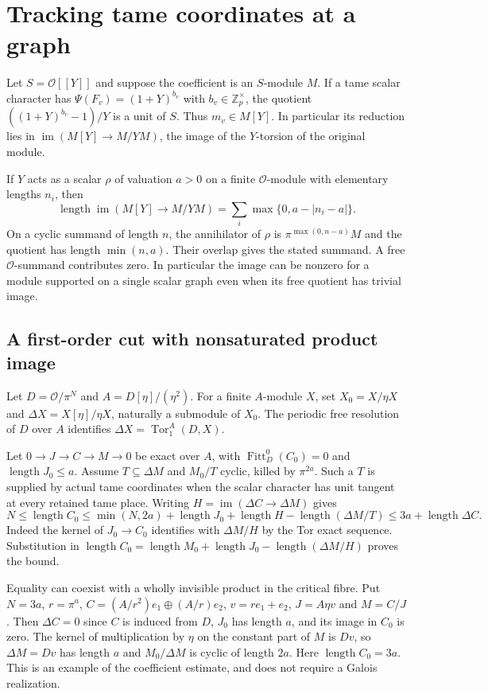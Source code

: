 \documentclass[11pt]{article}
\newcommand{\len}{\operatorname{length}}
\newcommand{\Fitt}{\operatorname{Fitt}}
\newcommand{\im}{\operatorname{im}}
\newcommand{\OO}{\mathcal O}
\begin{document}
\section{Tracking tame coordinates at a graph}
Let $S=\OO[[Y]]$ and suppose the coefficient is an $S$-module $M$.
If a tame scalar character has
$\Psi(F_v)=(1+Y)^{b_v}$ with $b_v\in\mathbb Z_p^\times$,
the quotient $((1+Y)^{b_v}-1)/Y$ is a unit of $S$. Thus $m_v\in M[Y]$.
In particular its reduction lies in $\im(M[Y]\to M/YM)$, the image
of the $Y$-torsion of the original module.

If $Y$ acts as a scalar $\rho$ of valuation $a>0$ on a finite
$\OO$-module with elementary lengths $n_i$, then
\[
 \len\im(M[Y]\to M/YM)
  =\sum_i \max\{0,a-|n_i-a|\}.
\]
On a cyclic summand of length $n$, the annihilator of $\rho$ is
$\pi^{\max(0,n-a)}M$ and the quotient has length $\min(n,a)$.
Their overlap gives the stated summand. A free $\OO$-summand contributes
zero. In particular the image can be nonzero for a module supported
on a single scalar graph even when its free quotient has trivial image.

\subsection{A first-order cut with nonsaturated product image}
Let $D=\OO/\pi^N$ and $A=D[\eta]/(\eta^2)$.
For a finite $A$-module $X$, set $X_0=X/\eta X$ and
$\Delta X=X[\eta]/\eta X$, naturally a submodule of $X_0$.
The periodic free resolution of $D$ over $A$ identifies
$\Delta X=\operatorname{Tor}_1^A(D,X)$.

Let $0\to J\to C\to M\to0$ be exact over $A$, with
$\Fitt_D^0(C_0)=0$ and $\len J_0\le a$. Assume $T\subseteq\Delta M$
and $M_0/T$ cyclic, killed by $\pi^{2a}$. Such a $T$ is supplied
by actual tame coordinates when the scalar character has unit tangent
at every retained tame place. Writing $H=\im(\Delta C\to\Delta M)$
gives
\[
 N\le\len C_0\le \min(N,2a)+\len J_0+\len H-\len(\Delta M/T)
 \le 3a+\len\Delta C .
\]
Indeed the kernel of $J_0\to C_0$ identifies with $\Delta M/H$ by
the Tor exact sequence. Substitution in
$\len C_0=\len M_0+\len J_0-\len(\Delta M/H)$ proves the bound.

Equality can coexist with a wholly invisible product in the critical
fibre. Put $N=3a$, $r=\pi^a$, $C=(A/r^2)e_1\oplus(A/r)e_2$,
$v=r e_1+e_2$, $J=A\eta v$ and $M=C/J$. Then $\Delta C=0$ since
$C$ is induced from $D$, $J_0$ has length $a$, and its image in $C_0$
is zero. The kernel of multiplication by $\eta$ on the constant
part of $M$ is $Dv$, so $\Delta M=Dv$ has length $a$ and $M_0/\Delta M$
is cyclic of length $2a$. Here $\len C_0=3a$. This is an example of
the coefficient estimate, and does not require a Galois realization.
\end{document}
